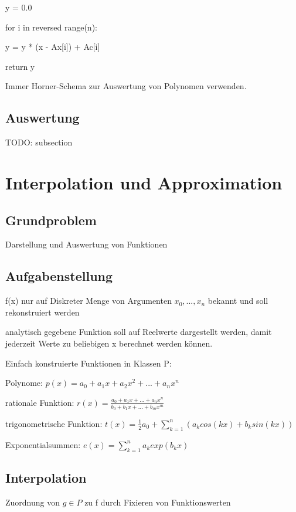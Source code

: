 \documentclass[12pt,a4paper]{article} %
\newcommand*\tab[1][1cm]{\hspace*{#1}}
\begin{document}
		y = 0.0
		
		for i in reversed range(n):
		
		\tab y = y * (x - Ax[i]) + Ac[i]
		  
		return y
		
		Immer Horner-Schema zur Auswertung von Polynomen verwenden.
		
		\subsection{Auswertung}
		TODO: subsection
		
		\newpage
		
		\section{Interpolation und Approximation}
		
		\subsection{Grundproblem}
		
		Darstellung und Auswertung von Funktionen
		
		\subsection{Aufgabenstellung}
		
		f(x) nur auf Diskreter Menge von Argumenten $x_0, ..., x_n$ bekannt und soll rekonstruiert werden
		
		analytisch gegebene Funktion soll auf Reelwerte dargestellt werden, damit jederzeit Werte zu beliebigen x berechnet werden können.
		
		Einfach konstruierte Funktionen in Klassen P:
		
		Polynome: $p(x) = a_0 + a_1x + a_2x^2 + ... + a_nx^n$
		
		rationale Funktion: $r(x) = \frac{a_0 + a_1x + ... + a_nx^n}{b_0 + b_1x + ... + b_mx^m}$
		
		trigonometrische Funktion: $t(x) = \frac{1}{2}a_0 + \sum_{k = 1}^{n}(a_kcos(kx) + b_ksin(kx))$
		
		Exponentialsummen: $e(x) = \sum_{k = 1}^{n}a_kexp(b_kx)$
		
		\subsection{Interpolation}
		
		Zuordnung von $g \in P$ zu f durch Fixieren von Funktionswerten
		
\end{document}
